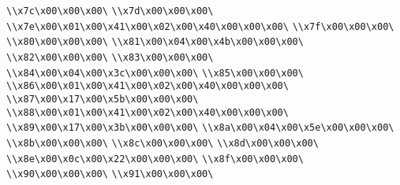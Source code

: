 \verb|\\x7c\x00\x00\x00\|\newline
\verb|\\x7d\x00\x00\x00\|\newline
\verb|\\x7e\x00\x01\x00\x41\x00\x02\x00\x40\x00\x00\x00\|\newline
\verb|\\x7f\x00\x00\x00\|\newline
\verb|\\x80\x00\x00\x00\|\newline
\verb|\\x81\x00\x04\x00\x4b\x00\x00\x00\|\newline
\verb|\\x82\x00\x00\x00\|\newline
\verb|\\x83\x00\x00\x00\|\newline
\verb|\\x84\x00\x04\x00\x3c\x00\x00\x00\|\newline
\verb|\\x85\x00\x00\x00\|\newline
\verb|\\x86\x00\x01\x00\x41\x00\x02\x00\x40\x00\x00\x00\|\newline
\verb|\\x87\x00\x17\x00\x5b\x00\x00\x00\|\newline
\verb|\\x88\x00\x01\x00\x41\x00\x02\x00\x40\x00\x00\x00\|\newline
\verb|\\x89\x00\x17\x00\x3b\x00\x00\x00\|\newline
\verb|\\x8a\x00\x04\x00\x5e\x00\x00\x00\|\newline
\verb|\\x8b\x00\x00\x00\|\newline
\verb|\\x8c\x00\x00\x00\|\newline
\verb|\\x8d\x00\x00\x00\|\newline
\verb|\\x8e\x00\x0c\x00\x22\x00\x00\x00\|\newline
\verb|\\x8f\x00\x00\x00\|\newline
\verb|\\x90\x00\x00\x00\|\newline
\verb|\\x91\x00\x00\x00\|\newline
